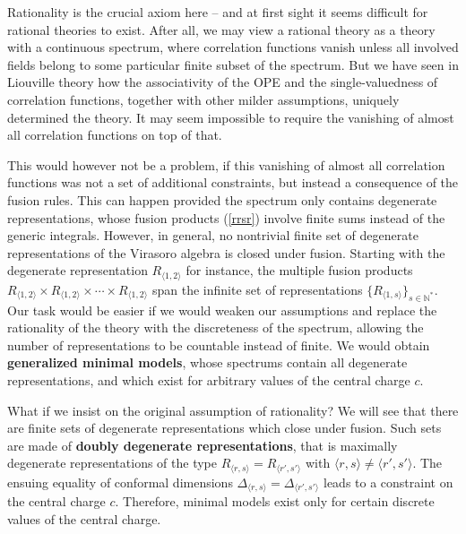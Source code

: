 \documentclass[12pt,a4paper,notitlepage]{report}
\newcommand \N {\mathbb{N}}
\numberwithin{equation}{section}
\theoremstyle{break}
\begin{document}
Rationality is the crucial axiom here -- and at first sight it seems difficult for rational theories to exist. After all, we may view a rational theory as a theory with a continuous spectrum, where correlation functions vanish unless all involved fields belong to some particular finite subset of the spectrum. But we have seen in Liouville theory how the associativity of the OPE and the single-valuedness of correlation functions, together with other milder assumptions, uniquely determined the theory. It may seem impossible to require the vanishing of almost all correlation functions on top of that. 

This would however not be a problem, if this vanishing of almost all correlation functions was not a set of additional constraints, but instead a consequence of the fusion rules. This can happen provided the spectrum only contains degenerate representations, whose fusion products (\ref{rrsr}) involve finite sums instead of the generic integrals. 
However, in general, no nontrivial finite set of degenerate representations of the Virasoro algebra is closed under fusion. Starting with the degenerate representation $R_{\langle 1,2 \rangle}$ for instance, the multiple fusion products $R_{\langle 1,2 \rangle}\times R_{\langle 1,2 \rangle}\times \cdots \times R_{\langle 1,2 \rangle}$ span the infinite set of representations $\{R_{\langle 1,s \rangle}\}_{s\in\N^*}$.
Our task would be easier if we would weaken our assumptions and replace the rationality of the theory with the discreteness of the spectrum, allowing the number of representations to be countable instead of finite. We would obtain \textbf{\boldmath generalized minimal models}, whose spectrums contain all degenerate representations, and which exist for arbitrary values of the central charge $c$. 

What if we insist on the original assumption of rationality? We will see that there are finite sets 
of degenerate representations which close under fusion. Such sets are made of
\textbf{\boldmath doubly degenerate representations}, that is maximally degenerate representations of the type $R_{\langle r,s \rangle}=R_{\langle r',s' \rangle}$ with $\langle r,s \rangle\neq \langle r',s' \rangle$. The ensuing equality of conformal dimensions $\Delta_{\langle r,s \rangle}=\Delta_{\langle r',s' \rangle}$ leads to a constraint on the central charge $c$. Therefore, minimal models exist only for certain discrete values of the central charge. 
\end{document}
